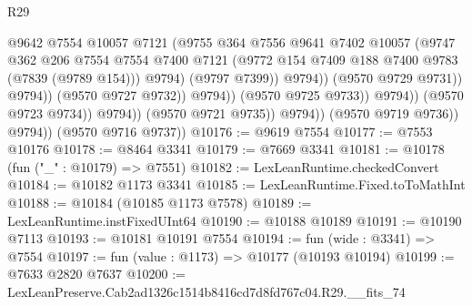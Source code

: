 \begin{lexlean}{R29}
\begin{coremodule}
                                              @9642
                                              @7554
                                              @10057
                                              @7121
                                              (@9755
                                                @364
                                                @7556
                                                @9641
                                                @7402
                                                @10057
                                                (@9747
                                                  @362
                                                  @206
                                                  @7554
                                                  @7554
                                                  @7400
                                                  @7121
                                                  (@9772
                                                    @154
                                                    @7409
                                                    @188
                                                    @7400
                                                    @9783
                                                    (@7839 (@9789 @154)))
                                                  @9794)
                                                (@9797 @7399))
                                              @9794))
                                          (@9570 @9729 @9731))
                                        @9794))
                                    (@9570 @9727 @9732))
                                  @9794))
                              (@9570 @9725 @9733))
                            @9794))
                        (@9570 @9723 @9734))
                      @9794))
                  (@9570 @9721 @9735))
                @9794))
            (@9570 @9719 @9736))
          @9794))
      (@9570 @9716 @9737))
@10176 := @9619 @7554
@10177 := @7553 @10176
@10178 := @8464 @3341
@10179 := @7669 @3341
@10181 := @10178 (fun ("_" : @10179) => @7551)
@10182 := LexLeanRuntime.checkedConvert
@10184 := @10182 @1173 @3341
@10185 := LexLeanRuntime.Fixed.toToMathInt
@10188 := @10184 (@10185 @1173 @7578)
@10189 := LexLeanRuntime.instFixedUInt64
@10190 := @10188 @10189
@10191 := @10190 @7113
@10193 := @10181 @10191 @7554
@10194 := fun (wide : @3341) => @7554
@10197 := fun (value : @1173) => @10177 (@10193 @10194)
@10199 := @7633 @2820 @7637
@10200 := LexLeanPreserve.Cab2ad1326c1514b8416cd7d8fd767c04.R29.__fits_74

\end{coremodule}
\end{lexlean}
